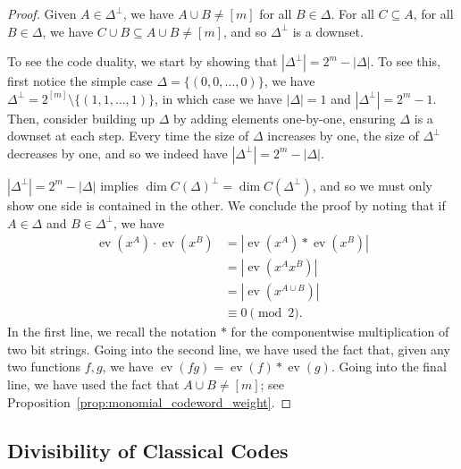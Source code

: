 \documentclass{article}
\DeclareMathOperator{\ev}{ev}
\begin{document}
\begin{proof}
    Given $A \in \Delta^\perp$, we have $A \cup B \neq [m]$ for all $B \in \Delta$. For all $C \subseteq A$, for all $B \in \Delta$, we have $C \cup B \subseteq A \cup B \neq [m]$, and so $\Delta^\perp$ is a downset.

    To see the code duality, we start by showing that $|\Delta^\perp| = 2^m - |\Delta|$. To see this, first notice the simple case $\Delta = \{(0, 0, \ldots, 0)\}$, we have $\Delta^\perp = 2^{[m]} \setminus \{(1, 1, \ldots, 1)\}$, in which case we have $|\Delta| = 1$ and $|\Delta^\perp| = 2^m-1$. Then, consider building up $\Delta$ by adding elements one-by-one, ensuring $\Delta$ is a downset at each step. Every time the size of $\Delta$ increases by one, the size of $\Delta^\perp$ decreases by one, and so we indeed have $|\Delta^\perp| = 2^m - |\Delta|$. 

    $|\Delta^\perp| = 2^m - |\Delta|$ implies $\dim C(\Delta)^\perp = \dim C(\Delta^\perp)$, and so we must only show one side is contained in the other. We conclude the proof by noting that if $A \in \Delta$ and $B \in \Delta^\perp$, we have
    \begin{align}
        \ev(x^A)\cdot \ev(x^B) &= |\ev(x^A) * \ev(x^B)| \\
        &= |\ev(x^Ax^B)|\\
        &= |\ev(x^{A\cup B})| \\
        &\equiv 0 \pmod 2.
    \end{align}
    In the first line, we recall the notation $*$ for the componentwise multiplication of two bit strings. Going into the second line, we have used the fact that, given any two functions $f,g$, we have $\ev(fg) = \ev(f) * \ev(g)$. Going into the final line, we have used the fact that $A \cup B \neq [m]$; see Proposition~\ref{prop:monomial_codeword_weight}.
\end{proof}
\subsection{Divisibility of Classical Codes}
\end{document}

